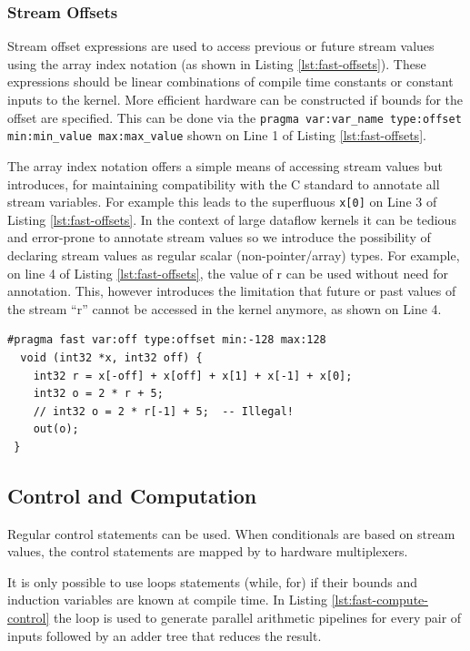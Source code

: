 \subsubsection{Stream Offsets}

Stream offset expressions are used to access previous or future stream
values using the array index notation (as shown in Listing
\ref{lst:fast-offsets}). These expressions should be linear
combinations of compile time constants or constant inputs to the
kernel. More efficient hardware can be constructed if bounds for the
offset are specified. This can be done via the \texttt{pragma
  var:var\_name type:offset min:min\_value max:max\_value} shown on
Line 1 of Listing \ref{lst:fast-offsets}.

The array index notation offers a simple means of accessing stream
values but introduces, for maintaining compatibility with the C
standard to annotate all stream variables. For example this leads to
the superfluous \texttt{x[0]} on Line 3 of Listing
\ref{lst:fast-offsets}. In the context of large dataflow kernels it
can be tedious and error-prone to annotate stream values so we
introduce the possibility of declaring stream values as regular scalar
(non-pointer/array) types. For example, on line 4 of Listing
\ref{lst:fast-offsets}, the value of r can be used without need for
annotation. This, however introduces the limitation that future or
past values of the stream ``r'' cannot be accessed in the kernel
anymore, as shown on Line 4.

\begin{lstlisting}[caption={\FAST{} kernel using offsets.},label={lst:fast-offsets}]
  #pragma fast var:off type:offset min:-128 max:128
  void (int32 *x, int32 off) {
    int32 r = x[-off] + x[off] + x[1] + x[-1] + x[0];
    int32 o = 2 * r + 5;
    // int32 o = 2 * r[-1] + 5;  -- Illegal!
    out(o);
 }
\end{lstlisting}


\subsection{Control and Computation}

Regular control statements can be used. When conditionals are based on
stream values, the control statements are mapped by \fastc{} to
hardware multiplexers.

It is only possible to use loops statements (while, for) if their
bounds and induction variables are known at compile time. In Listing
\ref{lst:fast-compute-control} the loop is used to generate parallel
arithmetic pipelines for every pair of inputs followed by an adder
tree that reduces the result.

